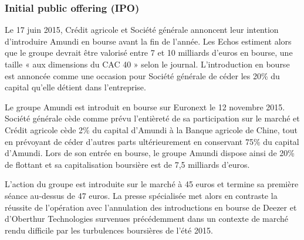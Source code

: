 \subsubsection{Initial public offering (IPO)}
\par Le 17 juin 2015, Crédit agricole et Société générale annoncent leur intention d'introduire Amundi en bourse avant la fin de l'année. Les Echos estiment alors que le groupe devrait être valorisé entre 7 et 10 milliards d'euros en bourse, une taille « aux dimensions du CAC 40 » selon le journal. L'introduction en bourse est annoncée comme une occasion pour Société générale de céder les 20\% du capital qu'elle détient dans l'entreprise.
\par Le groupe Amundi est introduit en bourse sur Euronext le 12 novembre 2015. Société générale cède comme prévu l'entièreté de sa participation sur le marché et Crédit agricole cède 2\% du capital d'Amundi à la Banque agricole de Chine, tout en prévoyant de céder d'autres parts ultérieurement en conservant 75\% du capital d'Amundi. Lors de son entrée en bourse, le groupe Amundi dispose ainsi de 20\% de flottant et sa capitalisation boursière est de 7,5 milliards d'euros.
\par L'action du groupe est introduite sur le marché à 45 euros et termine sa première séance au-dessus de 47 euros. La presse spécialisée met alors en contraste la réussite de l'opération avec l'annulation des introductions en bourse de Deezer et d'Oberthur Technologies survenues précédemment dans un contexte de marché rendu difficile par les turbulences boursières de l'été 2015.

